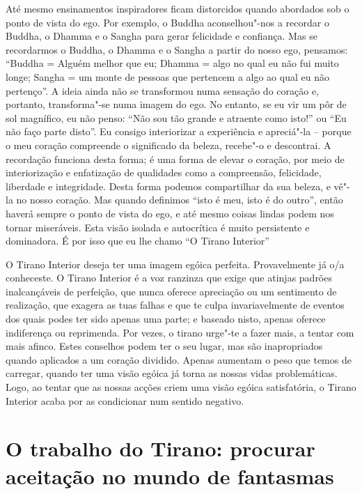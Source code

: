 \sectionBreak

Até mesmo ensinamentos inspiradores ficam distorcidos quando abordados
sob o ponto de vista do ego. Por exemplo, o Buddha aconselhou"-nos a
recordar o Buddha, o Dhamma e o Sangha para gerar felicidade e
confiança. Mas se recordarmos o Buddha, o Dhamma e o Sangha a partir do
nosso ego, pensamos: “Buddha = Alguém melhor que eu; Dhamma = algo no
qual eu não fui muito longe; Sangha = um monte de pessoas que pertencem
a algo ao qual eu não pertenço”. A ideia ainda não se transformou numa
sensação do coração e, portanto, transforma"-se numa imagem do ego. No
entanto, se eu vir um pôr de sol magnífico, eu não penso: “Não sou tão
grande e atraente como isto!” ou “Eu não faço parte disto”. Eu consigo
interiorizar a experiência e apreciá"-la -- porque o meu coração
compreende o significado da beleza, recebe"-o e descontrai. A recordação
funciona desta forma; é uma forma de elevar o coração, por meio de
interiorização e enfatização de qualidades como a compreensão,
felicidade, liberdade e integridade. Desta forma podemos compartilhar da
sua beleza, e vê"-la no nosso coração. Mas quando definimos ``isto é meu,
isto é do outro”, então haverá sempre o ponto de vista do ego, e até
mesmo coisas lindas podem nos tornar miseráveis. Esta visão isolada e
autocrítica é muito persistente e dominadora. É por isso que eu lhe
chamo “O Tirano Interior”

O Tirano Interior deseja ter uma imagem egóica perfeita. Provavelmente
já o/a conheceste. O Tirano Interior é a voz ranzinza que exige que
atinjas padrões inalcançáveis de perfeição, que nunca oferece apreciação
ou um sentimento de realização, que exagera as tuas falhas e que te
culpa invariavelmente de eventos dos quais podes ter sido apenas uma
parte; e baseado nisto, apenas oferece indiferença ou reprimenda. Por
vezes, o tirano urge"-te a fazer mais, a tentar com mais afinco. Estes
conselhos podem ter o seu lugar, mas são inapropriados quando aplicados
a um coração dividido. Apenas aumentam o peso que temos de carregar,
quando ter uma visão egóica já torna as nossas vidas problemáticas.
Logo, ao tentar que as nossas acções criem uma visão egóica
satisfatória, o Tirano Interior acaba por as condicionar num sentido
negativo.

\section{O trabalho do Tirano: procurar aceitação no mundo de
fantasmas}

